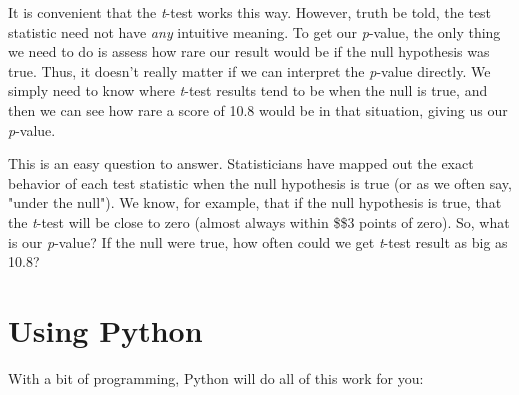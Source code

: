 \documentclass[11pt]{article}
\begin{document}
It is convenient that the \emph{t}-test works this way. However, truth
be told, the test statistic need not have \emph{any} intuitive meaning.
To get our \emph{p}-value, the only thing we need to do is assess how
rare our result would be if the null hypothesis was true. Thus, it
doesn't really matter if we can interpret the \emph{p}-value directly.
We simply need to know where \emph{t}-test results tend to be when the
null is true, and then we can see how rare a score of 10.8 would be in
that situation, giving us our \emph{p}-value.

This is an easy question to answer. Statisticians have mapped out the
exact behavior of each test statistic when the null hypothesis is true
(or as we often say, "under the null"). We know, for example, that if
the null hypothesis is true, that the \emph{t}-test will be close to
zero (almost always within \$\$3 points of zero). So, what is our
\emph{p}-value? If the null were true, how often could we get
\emph{t}-test result as big as 10.8?

\section{Using Python}\label{using-python}

With a bit of programming, Python will do all of this work for you:
\end{document}
